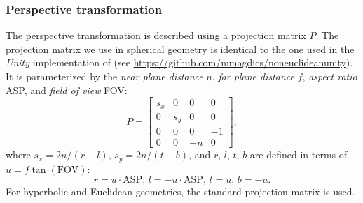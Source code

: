 \subsubsection{Perspective transformation}
The perspective transformation is described using a projection matrix $P$.
The projection matrix we use in spherical geometry is identical to the one used in the \textit{Unity} implementation of \cite{Szirmay-Kalos2022} (see \url{https://github.com/mmagdics/noneuclideanunity}).
It is parameterized by the \textit{near plane distance} $n$, \textit{far plane distance} $f$, \textit{aspect ratio} ASP, and \textit{field of view} FOV:
\begin{equation*}
    P =
    \begin{bmatrix}
        s_x & 0   & 0  & 0  \\
        0   & s_y & 0  & 0  \\
        0   & 0   & 0  & -1 \\
        0   & 0   & -n & 0
    \end{bmatrix},
\end{equation*}
where $s_x = 2n / (r - l)$, $s_y = 2n / (t - b)$, and $r$, $l$, $t$, $b$ are defined in terms of $u = f \tan(\mathrm{FOV})$:
\begin{equation*}
    r = u \cdot \mathrm{ASP}, \,
    l = -u \cdot \mathrm{ASP}, \,
    t = u, \,
    b =  -u.
\end{equation*}
For hyperbolic and Euclidean geometries, the standard projection matrix is used.

